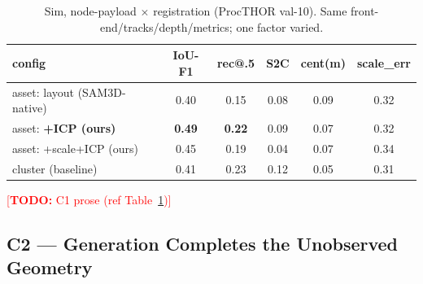 \documentclass[conference]{IEEEtran}
\newcommand{\todo}[1]{\textcolor{red}{[\textbf{TODO:} #1]}}
\begin{document}
\begin{table}[H]
  \centering
  \caption{Sim, node-payload $\times$ registration (ProcTHOR val-10). Same
  front-end/tracks/depth/metrics; one factor varied.}
  \label{tab:sim}
  \setlength{\tabcolsep}{3pt}
  \footnotesize
  \begin{tabular}{lccccc}
    \toprule
    config & IoU-F1 & rec@.5 & S2C & cent(m) & scale\_err \\
    \midrule
    asset: layout (SAM3D-native)   & 0.40 & 0.15 & 0.08 & 0.09 & 0.32 \\
    asset: \textbf{+ICP (ours)}    & \textbf{0.49} & \textbf{0.22} & 0.09 & 0.07 & 0.32 \\
    asset: +scale+ICP (ours)       & 0.45 & 0.19 & 0.04 & 0.07 & 0.34 \\
    cluster (baseline)             & 0.41 & 0.23 & 0.12 & 0.05 & 0.31 \\
    \bottomrule
  \end{tabular}
\end{table}


\todo{C1 prose (ref Table~\ref{tab:sim})}

\subsection{C2 --- Generation Completes the Unobserved Geometry}
\end{document}
